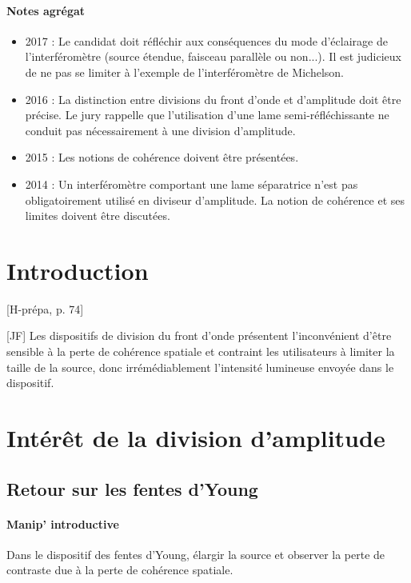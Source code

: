 \documentclass[11pt]{report}
\numberwithin{figure}{section}
\numberwithin{equation}{section}
\numberwithin{table}{section}
\newcommand{\1}{\boldsymbol{1}}
\begin{document}
\paragraph{Notes agrégat}

\begin{itemize}
\item 2017 : Le candidat doit réfléchir aux conséquences du mode d'éclairage de l'interféromètre (source étendue, faisceau parallèle ou non...). Il est judicieux de ne pas se limiter à l'exemple de l'interféromètre de Michelson.
\item 2016 : La distinction entre divisions du front d'onde et d'amplitude doit être précise. Le jury
rappelle que l'utilisation d'une lame semi-réfléchissante ne conduit pas nécessairement
à une division d'amplitude.
\item 2015 : Les notions de cohérence doivent être présentées.
\item 2014 : Un interféromètre comportant une lame séparatrice n'est pas obligatoirement utilisé
en diviseur d'amplitude. La notion de cohérence et ses limites doivent être discutées.
\end{itemize}

\section*{Introduction}

[H-prépa, p. 74]  
  
[JF]
Les dispositifs de division du front d'onde présentent l'inconvénient d'être sensible à la perte de cohérence spatiale et contraint les utilisateurs à limiter la taille de la source, donc irrémédiablement l'intensité lumineuse envoyée dans le dispositif.


\section{Intérêt de la division d'amplitude}

\subsection{Retour sur les fentes d'Young}

\paragraph{Manip' introductive} Dans le dispositif des fentes d'Young, élargir la source et observer la perte de contraste due à la perte de cohérence spatiale.
\end{document}
